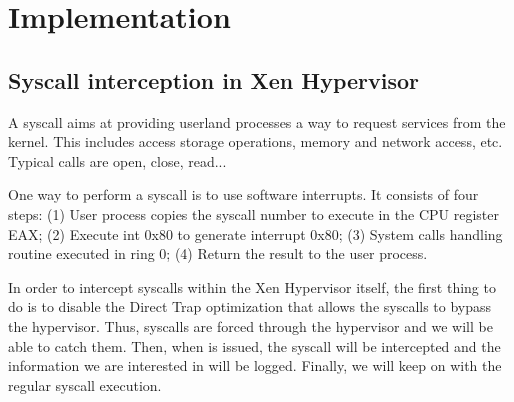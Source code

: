  \section{Implementation} \label{sec:impl}

\subsection{Syscall interception in Xen Hypervisor}\label{sec:interception}
A syscall aims at providing userland processes a way to request services 
from the kernel. This includes access storage operations, memory and network 
access, etc. Typical calls are open, close, read... 

One way to perform a syscall is to use software interrupts. It consists of 
four steps: (1) User process copies the syscall number to execute in the CPU register 
EAX; (2) Execute int 0x80 to generate interrupt 0x80; (3) System calls handling 
routine executed in ring 0; (4) Return the result to the user process.

In order to intercept syscalls within the Xen Hypervisor itself, the first thing to do 
is to disable the Direct Trap optimization that allows the syscalls to bypass the 
hypervisor. Thus, syscalls are forced through the hypervisor and we will be able to 
catch them.  Then, when is issued, the syscall will be intercepted and the information 
we are interested in will be logged. Finally, we will keep on with the regular syscall 
execution.
